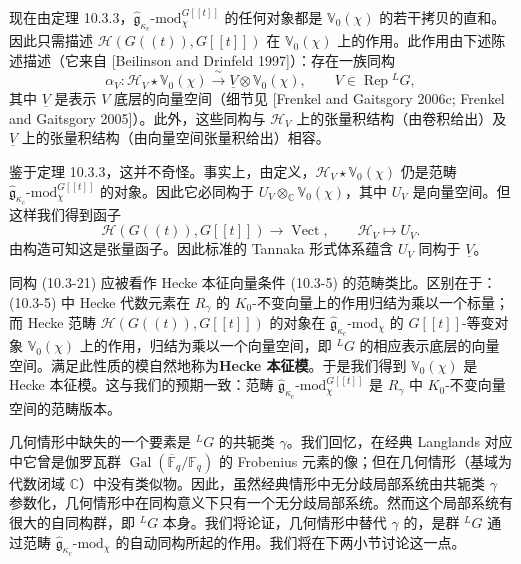 现在由定理 10.3.3，$\hat{\mathfrak{g}}_{\kappa_c}\text{-mod}^{G[[t]]}_\chi$ 的任何对象都是 $\mathbb{V}_0(\chi)$ 的若干拷贝的直和。因此只需描述 $\mathcal{H}(G((t)),G[[t]])$ 在 $\mathbb{V}_0(\chi)$ 上的作用。此作用由下述陈述描述（它来自 [Beilinson and Drinfeld 1997]）：存在一族同构
\begin{equation}
    \alpha_V:\mathcal{H}_V\star\mathbb{V}_0(\chi)\xrightarrow{\ \sim\ }
    \underline{V}\otimes\mathbb{V}_0(\chi),
    \qquad V\in\operatorname{Rep}{}^LG,
    \tag{10.3-21}
\end{equation}
其中 $\underline{V}$ 是表示 $V$ 底层的向量空间（细节见 [Frenkel and Gaitsgory 2006c; Frenkel and Gaitsgory 2005]）。此外，这些同构与 $\mathcal{H}_V$ 上的张量积结构（由卷积给出）及 $\underline{V}$ 上的张量积结构（由向量空间张量积给出）相容。


鉴于定理 10.3.3，这并不奇怪。事实上，由定义，$\mathcal{H}_V\star\mathbb{V}_0(\chi)$ 仍是范畴 $\hat{\mathfrak{g}}_{\kappa_c}\text{-mod}^{G[[t]]}_\chi$ 的对象。因此它必同构于 $U_V\otimes_{\mathbb{C}}\mathbb{V}_0(\chi)$，其中 $U_V$ 是向量空间。但这样我们得到函子
\[
    \mathcal{H}(G((t)),G[[t]])\to\operatorname{Vect},
    \qquad \mathcal{H}_V\mapsto U_V.
\]
由构造可知这是张量函子。因此标准的 Tannaka 形式体系蕴含 $U_V$ 同构于 $\underline{V}$。

同构 (10.3-21) 应被看作 Hecke 本征向量条件 (10.3-5) 的范畴类比。区别在于：(10.3-5) 中 Hecke 代数元素在 $R_\gamma$ 的 $K_0$-不变向量上的作用归结为乘以一个标量；而 Hecke 范畴 $\mathcal{H}(G((t)),G[[t]])$ 的对象在 $\hat{\mathfrak{g}}_{\kappa_c}\text{-mod}_\chi$ 的 $G[[t]]$-等变对象 $\mathbb{V}_0(\chi)$ 上的作用，归结为乘以一个向量空间，即 ${}^LG$ 的相应表示底层的向量空间。满足此性质的模自然地称为\textbf{Hecke 本征模}。于是我们得到 $\mathbb{V}_0(\chi)$ 是 Hecke 本征模。这与我们的预期一致：范畴 $\hat{\mathfrak{g}}_{\kappa_c}\text{-mod}^{G[[t]]}_\chi$ 是 $R_\gamma$ 中 $K_0$-不变向量空间的范畴版本。

几何情形中缺失的一个要素是 ${}^LG$ 的共轭类 $\gamma$。我们回忆，在经典 Langlands 对应中它曾是伽罗瓦群 $\operatorname{Gal}(\overline{\mathbb{F}}_q/\mathbb{F}_q)$ 的 Frobenius 元素的像；但在几何情形（基域为代数闭域 $\mathbb{C}$）中没有类似物。因此，虽然经典情形中无分歧局部系统由共轭类 $\gamma$ 参数化，几何情形中在同构意义下只有一个无分歧局部系统。然而这个局部系统有很大的自同构群，即 ${}^LG$ 本身。我们将论证，几何情形中替代 $\gamma$ 的，是群 ${}^LG$ 通过范畴 $\hat{\mathfrak{g}}_{\kappa_c}\text{-mod}_\chi$ 的自动同构所起的作用。我们将在下两小节讨论这一点。

